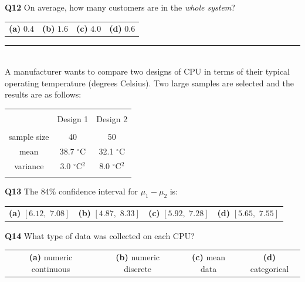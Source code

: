 \documentclass[12pt]{article}
\begin{document}
{\bf Q12} On average, how many customers are in the \emph{whole system}?\\[0.2cm]
\begin{tabular}{cccc}
{\bf(a)} $0.4$ & {\bf(b)} $1.6$ & {\bf(c)} $4.0$ & {\bf(d)} $0.6$ \\[0.6cm]
\end{tabular}

\rule{\linewidth}{1pt}
\quad\\
A manufacturer wants to compare two designs of CPU in terms of their typical operating temperature (degrees Celsius). Two large samples are selected and the results are as follows:
\begin{small}
\begin{center}
\begin{tabular}{|c|c|c|}
\hline
&&\\[-0.3cm]
& Design 1 & Design 2 \\
\hline
&&\\[-0.2cm]
sample size      & 40 & 50 \\[0.2cm]
mean   & 38.7 $^\circ$C & 32.1 $^\circ$C \\[0.2cm]
variance &  3.0 $^\circ$C$^2$ & 8.0 $^\circ$C$^2$ \\[0.2cm]
\hline
\multicolumn{3}{c}{}
\end{tabular}
\end{center}
\end{small}


{\bf Q13} The 84\% confidence interval for $\mu_1-\mu_2$ is:\\[0.2cm]
\begin{tabular}{cccc}
{\bf(a)} $[6.12,\,\,7.08]$ & {\bf(b)} $[4.87,\,\,8.33]$ & {\bf(c)} $[5.92,\,\,7.28]$ & {\bf(d)} $[5.65,\,\,7.55]$ \\[0.6cm]
\end{tabular}


{\bf Q14} What type of data was collected on each CPU? \\[0.2cm]
\begin{tabular}{cccc}
{\bf(a)} numeric continuous & {\bf(b)} numeric discrete  & {\bf(c)} mean data  & {\bf(d)} categorical \\[0.6cm]
\end{tabular}
\end{document}
